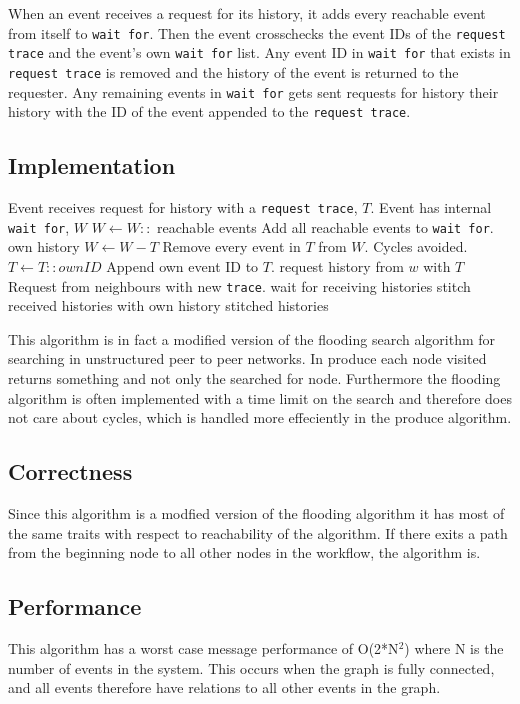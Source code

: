 	When an event receives a request for its history, it adds every reachable event from itself to \texttt{wait for}. Then the event crosschecks the event IDs of the \texttt{request trace} and the event's own \texttt{wait for} list. Any event ID in \texttt{wait for} that exists in \texttt{request trace} is removed and the history of the event is returned to the requester. Any remaining events in \texttt{wait for} gets sent requests for history their history with the ID of the event appended to the \texttt{request trace}. 
	
	\subsection{Implementation}
	\begin{algorithmic}
		\State Event receives request for history with a \texttt{request trace}, $T$.
		\State Event has internal \texttt{wait for}, $W$
		\State
		\State $W\gets W::$ reachable events \Comment Add all reachable events to \texttt{wait for}.
			\Return own history
		\Else
			\State $W\gets W-T$ \Comment Remove every event in $T$ from $W$. Cycles avoided.
			\State $T\gets T::ownID$ \Comment Append own event ID to $T$.
			\State
				\State request history from $w$ with $T$ \Comment Request from neighbours with new \texttt{trace}.
			\EndFor
			\State wait for receiving histories
			\State stitch received histories with own history
			\State
			\Return stitched histories
		\EndIf
	\end{algorithmic}
	
	\newpar This algorithm is in fact a modified version of the flooding search algorithm for searching in unstructured peer to peer networks. In produce each node visited returns something and not only the searched for node. Furthermore the flooding algorithm is often implemented with a time limit on the search and therefore does not care about cycles, which is handled more effeciently in the produce algorithm.
	
	\subsection{Correctness}
	Since this algorithm is a modfied version of the flooding algorithm it has most of the same traits with respect to reachability of the algorithm. If there exits a path from the beginning node to all other nodes in the workflow, the algorithm is. 
	
	\subsection{Performance}
	This algorithm has a worst case message performance of O(2*N$^2$) where N is the number of events in the system. This occurs when the graph is fully connected, and all events therefore have relations to all other events in the graph. 
	
